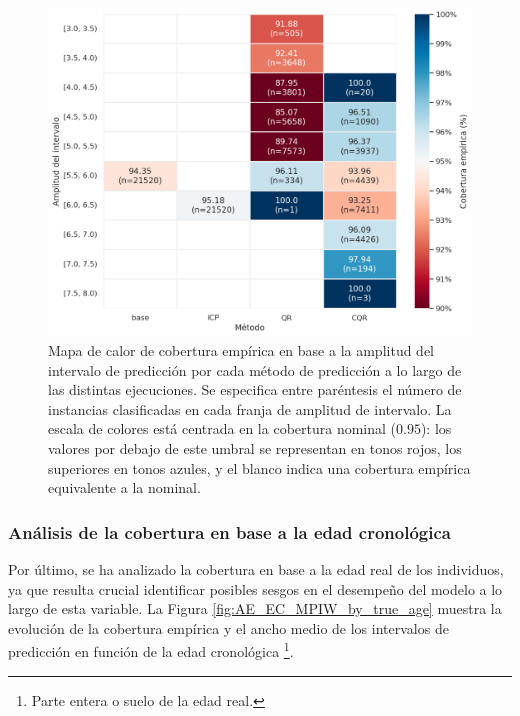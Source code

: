 \begin{figure}[htbp]
    \centering
    \includegraphics[width=\textwidth]{capitulos/cap_05/imagenes/AE_coverage_by_interval_width.png}
    \caption[
        Mapa de calor de cobertura empírica en base a la amplitud del intervalo de predicción por cada método de predicción a lo largo de las distintas ejecuciones. 
    ]{
        Mapa de calor de cobertura empírica en base a la amplitud del intervalo de predicción por cada método de predicción a lo largo de las distintas ejecuciones.
        Se especifica entre paréntesis el número de instancias clasificadas en cada franja de amplitud de intervalo.
        La escala de colores está centrada en la cobertura nominal ($0.95$): los valores por debajo de este umbral se representan en tonos rojos, los superiores en tonos azules, y el blanco indica una cobertura empírica equivalente a la nominal.
    }
    \label{fig:AE_coverage_by_interval_width}
\end{figure}




\subsubsection{Análisis de la cobertura en base a la edad cronológica}

Por último, se ha analizado la cobertura en base a la edad real de los individuos, ya que resulta crucial identificar posibles sesgos en el desempeño del modelo a lo largo de esta variable. 
La Figura \ref{fig:AE_EC_MPIW_by_true_age} muestra la evolución de la cobertura empírica y el ancho medio de los intervalos de predicción en función de la edad cronológica%
\footnote{
    Parte entera o suelo de la edad real.
}.

